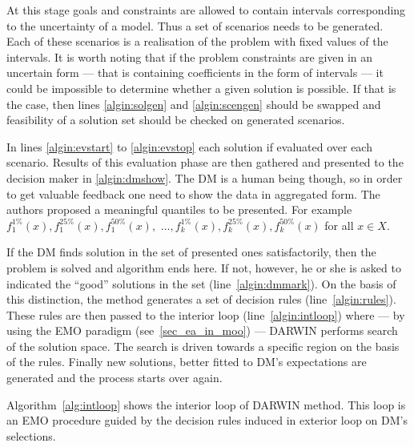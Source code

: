 At this stage goals and constraints are allowed to contain intervals
corresponding to the uncertainty of a model. Thus a set of scenarios needs to
be generated. Each of these scenarios is a realisation of the problem with
fixed values of the intervals. It is worth noting that if the problem
constraints are given in an uncertain form --- that is containing coefficients
in the form of intervals --- it could be impossible to determine whether a
given solution is possible. If that is the case, then lines \ref{algin:solgen}
and \ref{algin:scengen} should be swapped and feasibility of a solution set
should be checked on generated scenarios.

In lines \ref{algin:evstart} to \ref{algin:evstop} each solution if evaluated
over each scenario. Results of this evaluation phase are then gathered and
presented to the decision maker in \ref{algin:dmshow}. The DM is a human being
though, so in order to get valuable feedback one need to show the data in
aggregated form. The authors proposed a meaningful quantiles to be
presented. For example $f^{1\%}_1(x), f^{25\%}_1(x), f^{50\%}_1(x),$ $\dots,
f^{1\%}_k(x), f^{25\%}_k(x), f^{50\%}_k(x)$ for all $x \in X$.

If the DM finds solution in the set of presented ones satisfactorily, then the
problem is solved and algorithm ends here. If not, however, he or she is asked
to indicated the ``good'' solutions in the set (line~\ref{algin:dmmark}).  On
the basis of this distinction, the method generates a set of decision rules
(line~\ref{algin:rules}). These rules are then passed to the interior loop
(line~\ref{algin:intloop}) where --- by using the EMO paradigm
(see~\ref{sec_ea_in_moo}) --- DARWIN performs search of the solution
space. The search is driven towards a specific region on the basis of the
rules. Finally new solutions, better fitted to DM's expectations are generated
and the process starts over again.

Algorithm~\ref{alg:intloop} shows the interior loop of DARWIN method. This
loop is an EMO procedure guided by the decision rules induced in exterior loop
on DM's selections.

